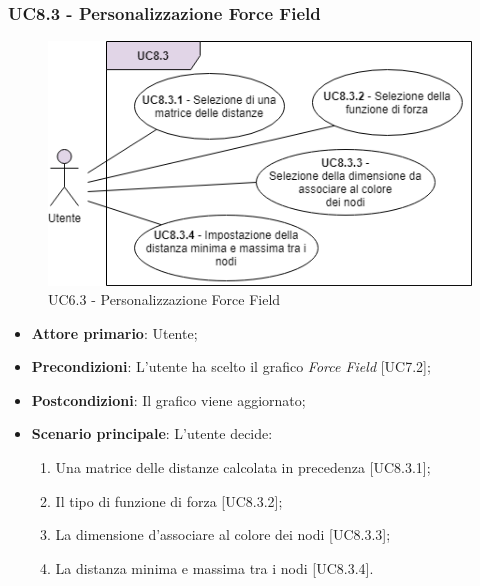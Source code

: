 \subsubsection{UC8.3 - Personalizzazione Force Field}
\begin{figure}[h]
\includegraphics[width=14cm]{Section/Images/UC8.3.png}
\centering
\caption{UC6.3 - Personalizzazione Force Field}
\end{figure}
\begin{itemize}
	\item \textbf{Attore primario}: Utente;
	
	\item \textbf{Precondizioni}: L'utente ha scelto il grafico \textit{Force Field} [UC7.2];
	
	\item \textbf{Postcondizioni}: Il grafico viene aggiornato;
	
	\item \textbf{Scenario principale}: L'utente decide:
	
\begin{enumerate}
\item Una matrice delle distanze calcolata in precedenza [UC8.3.1];
\item Il tipo di funzione di forza [UC8.3.2];
\item La dimensione d'associare al colore dei nodi [UC8.3.3];
\item La distanza minima e massima tra i nodi [UC8.3.4].
\end{enumerate}	
		
\end{itemize}

